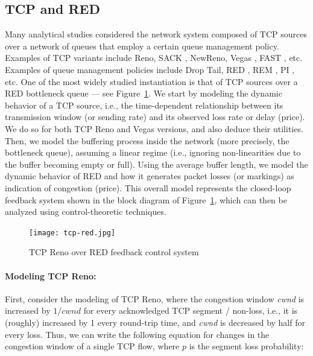 \documentclass{article}
\begin{document}
\subsection{TCP and RED}
 
Many analytical studies considered the network system composed of TCP sources over a network of queues that employ a certain queue management policy. Examples of TCP variants include Reno, SACK \cite{Fall:1996}, NewReno, Vegas \cite{vegas:1995}, FAST \cite{fast:2006}, etc. Examples of queue management policies include Drop Tail, RED \cite{red:1993}, REM \cite{REM:2001}, PI \cite{PI:2000}, etc. One of the most widely studied instantiation is that of TCP sources over a RED bottleneck queue --- see Figure~\ref{fig:TCP-RED-diagram}.
We start by modeling the dynamic behavior of a TCP source, i.e., 
the time-dependent relationship between its transmission window (or sending rate) and 
its observed loss rate or delay (price).
We do so for both TCP Reno and Vegas versions, and also deduce their utilities.
Then, we model the buffering process inside the network (more precisely, the bottleneck queue),
assuming a linear regime (i.e., ignoring non-linearities due to the buffer becoming empty or full).
Using the average buffer length, we model the dynamic behavior of RED and how 
it generates packet losses (or markings) as indication of congestion (price).
This overall model represents the closed-loop feedback system shown in 
the block diagram of Figure~\ref{fig:TCP-RED-diagram}, 
which can then be analyzed using control-theoretic techniques.
\begin{figure}[htbp]
   \centering
   \texttt{[image: tcp-red.jpg]} %
   \caption{TCP Reno over RED feedback control system}
   \label{fig:TCP-RED-diagram}
\end{figure}

\paragraph{Modeling TCP Reno:} First, consider the modeling of TCP Reno, where the congestion window {\em cwnd} is increased by $1/cwnd$ for every acknowledged TCP segment / non-loss, i.e., it is (roughly) increased by 1 every round-trip time, and {\em cwnd} is decreased by half for every loss. Thus, we can write the following equation for changes in the congestion window of a single TCP flow, where $p$ is the segment loss probability:
\end{document}
